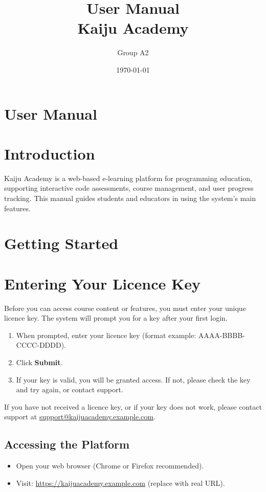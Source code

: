 \documentclass[a4paper,11pt]{scrartcl}
\title{User Manual\\Kaiju Academy}
\author{Group A2}
\date{\today}
\begin{document}
\maketitle

\section*{User Manual}

\tableofcontents
\newpage

\section{Introduction}

Kaiju Academy is a web-based e-learning platform for programming education, supporting interactive code assessments, course management, and user progress tracking. This manual guides students and educators in using the system’s main features.



\section{Getting Started}

\section{Entering Your Licence Key}

Before you can access course content or features, you must enter your unique licence key. The system will prompt you for a key after your first login.

\begin{enumerate}[leftmargin=*]
    \item When prompted, enter your licence key (format example: AAAA-BBBB-CCCC-DDDD).
    \item Click \textbf{Submit}.
    \item If your key is valid, you will be granted access. If not, please check the key and try again, or contact support.
\end{enumerate}

If you have not received a licence key, or if your key does not work, please contact support at \href{mailto:support@kaijuacademy.example.com}{support@kaijuacademy.example.com}.

\subsection{Accessing the Platform}
\begin{itemize}[leftmargin=*]
    \item Open your web browser (Chrome or Firefox recommended).
    \item Visit: \url{https://kaijuacademy.example.com} (replace with real URL).
\end{itemize}
\end{document}
